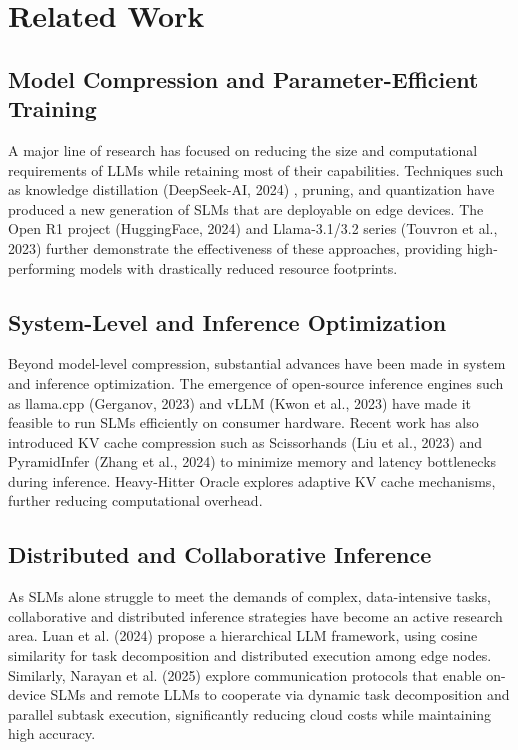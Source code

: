 \section{Related Work}
\subsection{Model Compression and Parameter-Efficient Training}
A major line of research has focused on reducing the size and computational requirements of LLMs while retaining most of their capabilities. Techniques such as knowledge distillation (DeepSeek-AI, 2024) \cite{DeepSeek-RL}, pruning, and quantization have produced a new generation of SLMs that are deployable on edge devices. The Open R1 project (HuggingFace, 2024) \cite{HuggingFace2024OpenR1} and Llama-3.1/3.2 series (Touvron et al., 2023) \cite{Touvron2023LLaMA} further demonstrate the effectiveness of these approaches, providing high-performing models with drastically reduced resource footprints.

\subsection{System-Level and Inference Optimization}
Beyond model-level compression, substantial advances have been made in system and inference optimization. The emergence of open-source inference engines such as llama.cpp (Gerganov, 2023) \cite{gerganov2023llamacpp} and vLLM (Kwon et al., 2023) \cite{Kwon2023vLLM} have made it feasible to run SLMs efficiently on consumer hardware. Recent work has also introduced KV cache compression such as Scissorhands (Liu et al., 2023) \cite{Liu2023Scissorhands} and PyramidInfer (Zhang et al., 2024) \cite{Zhang2024PyramidInfer} to minimize memory and latency bottlenecks during inference. Heavy-Hitter Oracle explores adaptive KV cache mechanisms, further reducing computational overhead.

\subsection{Distributed and Collaborative Inference}
As SLMs alone struggle to meet the demands of complex, data-intensive tasks, collaborative and distributed inference strategies have become an active research area. Luan et al. (2024) \cite{Luan2024Hierarchical} propose a hierarchical LLM framework, using cosine similarity for task decomposition and distributed execution among edge nodes. Similarly, Narayan et al. (2025) \cite{Narayan2025Minions} explore communication protocols that enable on-device SLMs and remote LLMs to cooperate via dynamic task decomposition and parallel subtask execution, significantly reducing cloud costs while maintaining high accuracy.

